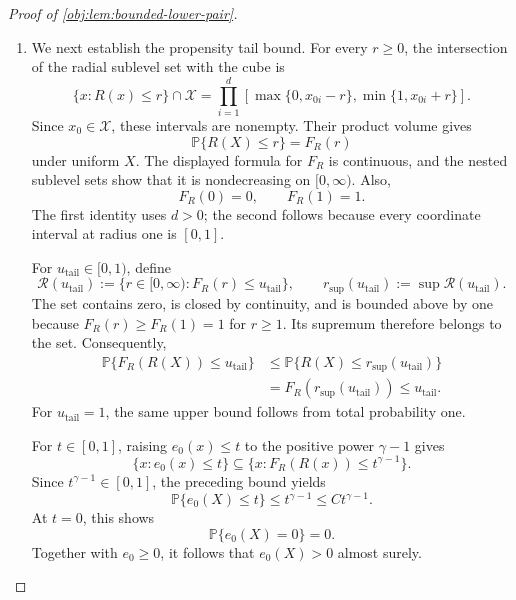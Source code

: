 \documentclass[11pt]{article}
\begin{document}
\begin{proof}[Proof of \cref{obj:lem:bounded-lower-pair}]
\begin{enumerate}
The treated potential-outcome marginal of the conditional product kernel
is \(B\operatorname{Bernoulli}(p_{j,h}(x))\). Thus, under the constructed
completion,
\[
\mathbb E_{\widetilde P_{j,h}}[Y(1)\mid X=x]
=(1-p_{j,h}(x))\,0+p_{j,h}(x)B
=\mu_{j,h}(x)
\]
for Lebesgue-almost every \(x\in\mathcal X\). This establishes the
response smoothness requirement in \cref{obj:ass:holder-response}.

\item We next establish the propensity tail bound. For every \(r\ge0\),
the intersection of the radial sublevel set with the cube is
\[
\{x:R(x)\le r\}\cap\mathcal X
=
\prod_{i=1}^{d}
\left[
\max\{0,x_{0i}-r\},
\min\{1,x_{0i}+r\}
\right].
\]
Since \(x_0\in\mathcal X\), these intervals are nonempty. Their product
volume gives
\[
\mathbb P\{R(X)\le r\}=F_R(r)
\]
under uniform \(X\). The displayed formula for \(F_R\) is continuous,
and the nested sublevel sets show that it is nondecreasing on
\([0,\infty)\). Also,
\[
F_R(0)=0,\qquad F_R(1)=1.
\]
The first identity uses \(d>0\); the second follows because every
coordinate interval at radius one is \([0,1]\).

For \(u_{\mathrm{tail}}\in[0,1)\), define
\[
\mathscr R(u_{\mathrm{tail}})
:=
\{r\in[0,\infty):F_R(r)\le u_{\mathrm{tail}}\},
\qquad
r_{\sup}(u_{\mathrm{tail}})
:=\sup\mathscr R(u_{\mathrm{tail}}).
\]
The set contains zero, is closed by continuity, and is bounded above
by one because \(F_R(r)\ge F_R(1)=1\) for \(r\ge1\). Its supremum
therefore belongs to the set. Consequently,
\[
\begin{aligned}
\mathbb P\{F_R(R(X))\le u_{\mathrm{tail}}\}
&\le \mathbb P\{R(X)\le r_{\sup}(u_{\mathrm{tail}})\}\\
&=F_R(r_{\sup}(u_{\mathrm{tail}}))
\le u_{\mathrm{tail}}.
\end{aligned}
\]
For \(u_{\mathrm{tail}}=1\), the same upper bound follows from total
probability one.

For \(t\in[0,1]\), raising \(e_0(x)\le t\) to the positive power
\(\gamma-1\) gives
\[
\{x:e_0(x)\le t\}
\subseteq
\{x:F_R(R(x))\le t^{\gamma-1}\}.
\]
Since \(t^{\gamma-1}\in[0,1]\), the preceding bound yields
\[
\mathbb P\{e_0(X)\le t\}
\le t^{\gamma-1}
\le Ct^{\gamma-1}.
\]
At \(t=0\), this shows
\[
\mathbb P\{e_0(X)=0\}=0.
\]
Together with \(e_0\ge0\), it follows that \(e_0(X)>0\) almost surely.


\end{enumerate}
\end{proof}
\end{document}

